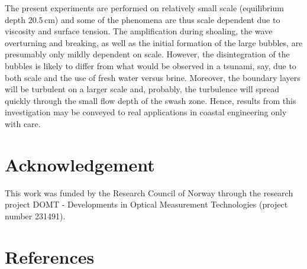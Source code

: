 \documentclass[review, authoryear]{elsarticle}
\newcommand{\cm}{\,\mbox{cm}}
\begin{document}
The present experiments are performed on relatively small scale (equilibrium depth $20.5\cm$) and some of the phenomena are thus scale dependent due to viscosity and surface tension. The amplification during shoaling, the wave overturning and breaking, as well as the initial formation of the large bubbles, are 
presumably only mildly dependent on scale. However, the disintegration of 
the bubbles is likely to differ from what would be observed in a tsunami, say,
due to both scale and the use of fresh water versus brine. Moreover, the boundary layers will be turbulent on a larger scale and, probably, the turbulence will
spread quickly through the small flow depth of the swash zone.
Hence, results from this investigation may be conveyed to real applications in coastal engineering only with care.  

\section*{Acknowledgement}

This work was funded by the Research Council of Norway through the research project DOMT - Developments in Optical Measurement Technologies (project number 231491).

\section*{References}

 
\end{document}
